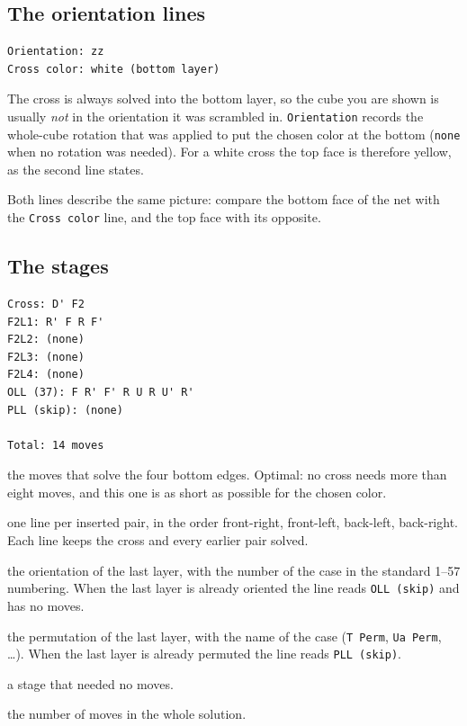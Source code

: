 \subsection{The orientation lines}

\begin{lstlisting}[style=shell]
Orientation: zz
Cross color: white (bottom layer)
\end{lstlisting}

The cross is always solved into the bottom layer, so the cube you are shown is
usually \emph{not} in the orientation it was scrambled in.  \texttt{Orientation}
records the whole-cube rotation that was applied to put the chosen color at the
bottom (\texttt{none} when no rotation was needed).  For a white cross the top face
is therefore yellow, as the second line states.

Both lines describe the same picture: compare the bottom face of the net with the
\texttt{Cross color} line, and the top face with its opposite.

\subsection{The stages}

\begin{lstlisting}[style=shell]
Cross: D' F2
F2L1: R' F R F'
F2L2: (none)
F2L3: (none)
F2L4: (none)
OLL (37): F R' F' R U R U' R'
PLL (skip): (none)

Total: 14 moves
\end{lstlisting}

\begin{description}[leftmargin=0em,style=nextline]
  \item[\texttt{Cross}] the moves that solve the four bottom edges.  Optimal: no
  cross needs more than eight moves, and this one is as short as possible for the
  chosen color.
  \item[\texttt{F2L1} to \texttt{F2L4}] one line per inserted pair, in the order
  front-right, front-left, back-left, back-right.  Each line keeps the cross and
  every earlier pair solved.
  \item[\texttt{OLL (\textit{n})}] the orientation of the last layer, with the
  number of the case in the standard 1--57 numbering.  When the last layer is
  already oriented the line reads \texttt{OLL (skip)} and has no moves.
  \item[\texttt{PLL (\textit{name})}] the permutation of the last layer, with the
  name of the case (\texttt{T Perm}, \texttt{Ua Perm}, \ldots).  When the last layer
  is already permuted the line reads \texttt{PLL (skip)}.
  \item[\texttt{(none)}] a stage that needed no moves.
  \item[\texttt{Total}] the number of moves in the whole solution.
\end{description}

